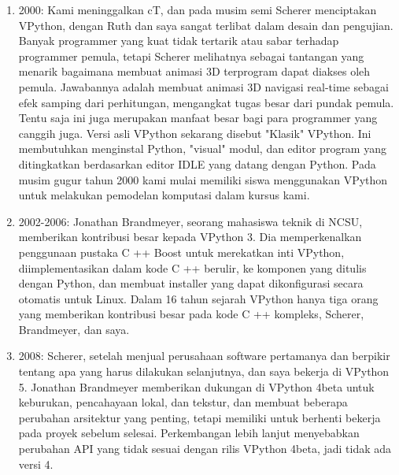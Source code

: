 \begin{enumerate}
			\item 2000: Kami meninggalkan cT, dan pada musim semi Scherer menciptakan VPython, dengan Ruth dan saya sangat terlibat dalam desain dan pengujian. Banyak programmer yang kuat tidak tertarik atau sabar terhadap programmer pemula, tetapi Scherer melihatnya sebagai tantangan yang menarik bagaimana membuat animasi 3D terprogram dapat diakses oleh pemula. Jawabannya adalah membuat animasi 3D navigasi real-time sebagai efek samping dari perhitungan, mengangkat tugas besar dari pundak pemula. Tentu saja ini juga merupakan manfaat besar bagi para programmer yang canggih juga. Versi asli VPython sekarang disebut "Klasik" VPython. Ini membutuhkan menginstal Python, "visual" modul, dan editor program yang ditingkatkan berdasarkan editor IDLE yang datang dengan Python. Pada musim gugur tahun 2000 kami mulai memiliki siswa menggunakan VPython untuk melakukan pemodelan komputasi dalam kursus kami.
			\item 2002-2006: Jonathan Brandmeyer, seorang mahasiswa teknik di NCSU, memberikan kontribusi besar kepada VPython 3. Dia memperkenalkan penggunaan pustaka C ++ Boost untuk merekatkan inti VPython, diimplementasikan dalam kode C ++ berulir, ke komponen yang ditulis dengan Python, dan membuat installer yang dapat dikonfigurasi secara otomatis untuk Linux. Dalam 16 tahun sejarah VPython hanya tiga orang yang memberikan kontribusi besar pada kode C ++ kompleks, Scherer, Brandmeyer, dan saya.
			\item 2008: Scherer, setelah menjual perusahaan software pertamanya dan berpikir tentang apa yang harus dilakukan selanjutnya, dan saya bekerja di VPython 5. Jonathan Brandmeyer memberikan dukungan di VPython 4beta untuk keburukan, pencahayaan lokal, dan tekstur, dan membuat beberapa perubahan arsitektur yang penting, tetapi memiliki untuk berhenti bekerja pada proyek sebelum selesai. Perkembangan lebih lanjut menyebabkan perubahan API yang tidak sesuai dengan rilis VPython 4beta, jadi tidak ada versi 4.

		\end{enumerate}
